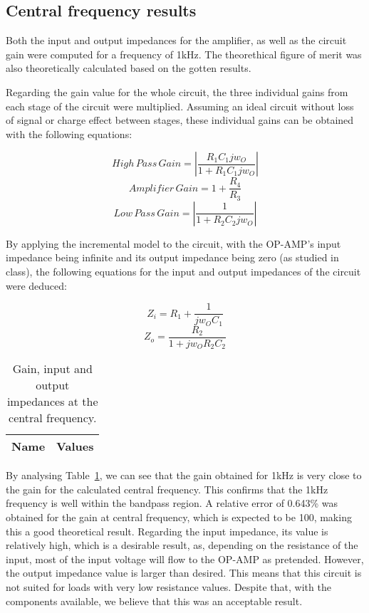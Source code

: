 \pagebreak

\subsection{Central frequency results}

Both the input and output impedances for the amplifier, as well as the circuit gain were computed for a frequency of 1kHz. The theorethical figure of merit was also theoretically calculated based on the gotten results. 

Regarding the gain value for the whole circuit, the three individual gains from each stage of the circuit were multiplied. Assuming an ideal circuit without loss of signal or charge effect between stages, these individual gains can be obtained with the following equations: 

\begin{equation}
High\,Pass\,Gain=|\frac{R_{1}C_{1}jw_{O}}{1+R_{1}C_{1}jw_{O}}|
\end{equation}
\begin{equation}
Amplifier\,Gain=1+\frac{R_{4}}{R_{3}}
\end{equation}
\begin{equation}
Low\,Pass\,Gain=|\frac{1}{1+R_{2}C_{2}jw_{O}}|
\end{equation}

By applying the incremental model to the circuit, with the OP-AMP's input impedance being infinite and its output impedance being zero (as studied in class), the following equations for the input and output impedances of the circuit were deduced:

\begin{equation}
Z_i = R_1 + \frac{1}{jw_{O}C_{1}}
\end{equation}
\begin{equation}
Z_o = \frac{R_2}{1+jw_OR_2C_2}
\end{equation}

\begin{table}[h!]
  \centering
  \begin{tabular}{|l|r|}
    \hline    
    {\bf Name} & {\bf Values} \\ \hline
     
  \end{tabular}
  \caption{Gain, input and output impedances at the central frequency.}
  \label{tab:data}
\end{table}

By analysing Table~\ref{tab:data}, we can see that the gain obtained for 1kHz is very close to the gain for the calculated central frequency. This confirms that the 1kHz frequency is well within the bandpass region. A relative error of 0.643\% was obtained for the gain at central frequency, which is expected to be 100, making this a good theoretical result. Regarding the input impedance, its value is relatively high, which is a desirable result, as, depending on the resistance of the input, most of the input voltage will flow to the OP-AMP as pretended. However, the output impedance value is larger than desired. This means that this circuit is not suited for loads with very low resistance values. Despite that, with the components available, we believe that this was an acceptable result. 
